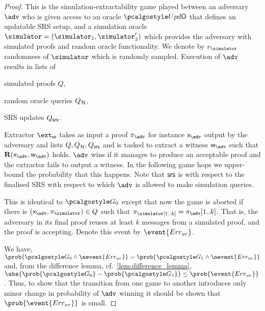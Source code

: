 \begin{proof}		
	
	 This is the simulation-extractability game played between an adversary
	$\advse$ who is given access to an oracle $\initU$ that defines an updatable SRS
	setup, and a simulation oracle $\simulator = (\simulator_1, \simulator_2')$ which provides the adversary with simulated
	proofs and random oracle functionality. We denote by $\rsim$
	randomness of $\simulator$ which is randomly sampled. Execution of $\advse$ results in
	lists of
	\begin{inparaenum}[(1)]
		\item simulated proofs $Q$,
		\item random oracle queries $Q_{\mathcal{H}}$,
		\item SRS updates $Q_{\mathsf{srs}}$.
	\end{inparaenum}
	Extractor $\extse$ takes as input a proof $\zkproof_{\advse}$ for instance
	$\inp_{\advse}$ output by the adversary and lists $Q, Q_{\mathcal{H}}, Q_{\mathsf{srs}}$ and is tasked
	to extract a witness $\wit_{\advse}$ such that $\REL(\inp_{\advse}, \wit_{\advse})$
	holds. $\advse$ wins if it manages to produce an acceptable proof and the extractor
	fails to output a witness. In the following game hops we upper-bound the
	probability that this happens. Note that $\mathsf{srs}$ is with respect to the finalised
	SRS with respect to which $\adv$ is allowed to make simulation queries.
	
	 This is identical to $\game{0}$ except that now the game is aborted if
	there is $(\inp_\advse, \zkproof_{\simulator}) \in Q$ such that
	$\zkproof_\simulator[1..k] = \zkproof_{\advse}[1..k]$. That is, the adversary in
	its final proof reuses at least $k$ messages from a simulated proof, and the proof
	is accepting.  Denote this event by $\event{\errur}$.
	
	 We have,
	\( \prob{\game{0} \land \nevent{\errur}} = \prob{\game{1} \land \nevent{\errur}} \)
	and, from the difference lemma, cf.~\cref{lem:difference_lemma},
	$ \abs{\prob{\game{0}} - \prob{\game{1}}} \leq \prob{\event{\errur}}\,$.  Thus, to
	show that the transition from one game to another introduces only minor change in
	probability of $\adv$ winning it should be shown that $\prob{\event{\errur}}$ is
	small.
	

\end{proof}
